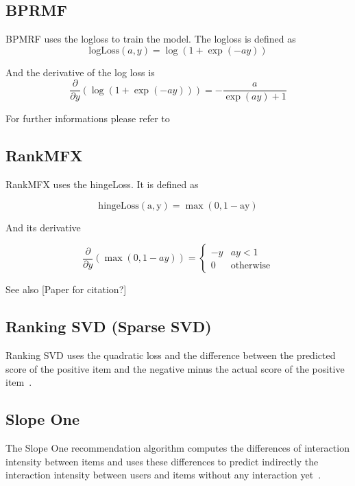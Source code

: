 \subsection{BPRMF}

BPMRF uses the logloss to train the model. The logloss is defined
as
\[
\textrm{logLoss}(a,y)=\log(1+\exp(-ay))
\]


And the derivative of the log loss is
\[
\frac{\partial}{\partial y}(\log(1+\exp(-ay)))=-\frac{a}{\exp(ay)+1}
\]


For further informations please refer to~\cite{Rendle:2009:BBP:1795114.1795167}


\subsection{RankMFX}

RankMFX uses the hingeLoss. It is defined as

\[
\mathrm{\textrm{hingeLoss}(a,y)=\max(0,1-ay)}
\]


And its derivative

\[
\frac{\partial}{\partial y}(\max(0,1-ay))=\begin{cases}
-y & ay<1\\
0 & \textrm{otherwise}
\end{cases}
\]


See also {[}Paper for citation?{]}


\subsection{Ranking SVD (Sparse SVD)}

Ranking SVD uses the quadratic loss and the difference between the
predicted score of the positive item and the negative minus the actual
score of the positive item~\cite{jahrer2011collaborative}.

\subsection{Slope One}

The Slope One recommendation algorithm computes the differences of
interaction intensity between items and uses these differences to 
predict indirectly the interaction intensity between users and items
without any interaction yet~\cite{DBLP:journals/corr/abs-cs-0702144}.
